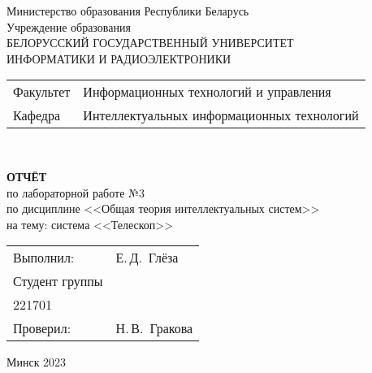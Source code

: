 \begin{titlepage}
 \begin{center}
    Министерство образования Республики Беларусь\\[1em]
    Учреждение образования\\
    БЕЛОРУССКИЙ ГОСУДАРСТВЕННЫЙ УНИВЕРСИТЕТ \\
    ИНФОРМАТИКИ И РАДИОЭЛЕКТРОНИКИ\\[1em]

    \begin{minipage}{\textwidth}
      \begin{flushleft}
        \begin{tabular}{ l l }
          Факультет & Информационных технологий и управления\\
          Кафедра   & Интеллектуальных информационных технологий
        \end{tabular}
      \end{flushleft}
    \end{minipage}\\[1em]

    \vspace{5em}


    \textbf{ОТЧЁТ}\\
    {по лабораторной работе №3}\\
    {по дисциплине <<Общая теория интеллектуальных систем>>}\\
    {на тему: система <<Телескоп>>}
    \vspace{10em}
    
    \begin{tabular}{ p{}p{} }
      Выполнил:& Е.\,Д.~Глёза \\[1em]
      Студент группы& \\
      221701 & \\
      Проверил: & Н.\,В.~Гракова \\
     
    \end{tabular}
    
    \vfill
    {\normalsize Минск 2023}
  \end{center}
\end{titlepage}
